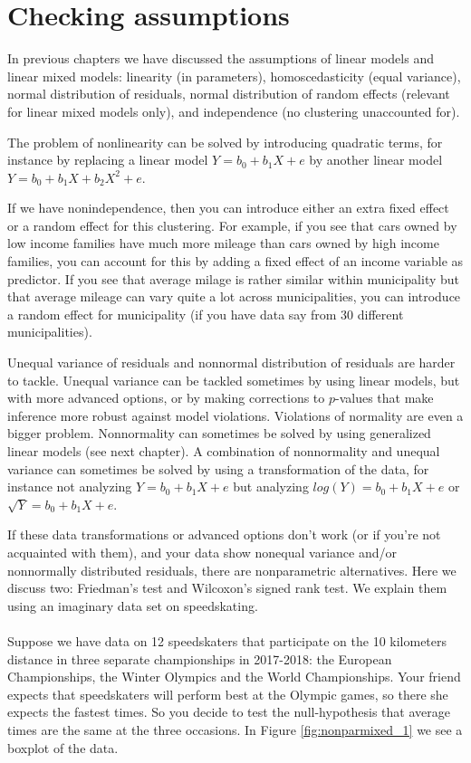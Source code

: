 \documentclass[]{book}\usepackage[]{graphicx}\usepackage[]{color}
\begin{document}
\section{Checking assumptions}

In previous chapters we have discussed the assumptions of linear models and linear mixed models: linearity (in parameters), homoscedasticity (equal variance), normal distribution of residuals, normal distribution of random effects (relevant for linear mixed models only), and independence (no clustering unaccounted for). 




The problem of nonlinearity can be solved by introducing quadratic terms, for instance by replacing a linear model $Y = b_0 + b_1 X + e$ by another linear model $Y = b_0 + b_1 X + b_2 X^2 + e$.

If we have nonindependence, then you can introduce either an extra fixed effect or a random effect for this clustering. For example, if you see that cars owned by low income families have much more mileage than cars owned by high income families, you can account for this by adding a fixed effect of an income variable as predictor. If you see that average milage is rather similar within municipality but that average mileage can vary quite a lot across municipalities, you can introduce a random effect for municipality (if you have data say from 30 different municipalities). 

Unequal variance of residuals and nonnormal distribution of residuals are harder to tackle. Unequal variance can be tackled sometimes by using linear models, but with more advanced options, or by making corrections to $p$-values that make inference more robust against model violations. Violations of normality are even a bigger problem. Nonnormality can sometimes be solved by using generalized linear models (see next chapter). A combination of nonnormality and unequal variance can sometimes be solved by using a transformation of the data, for instance not analyzing $Y = b_0 + b_1 X + e$ but analyzing $log(Y)=  b_0 + b_1 X + e$ or $\sqrt{Y}=  b_0 + b_1 X + e$.

If these data transformations or advanced options don't work (or if you're not acquainted with them), and your data show nonequal variance and/or nonnormally distributed residuals, there are nonparametric alternatives.  Here we discuss two: Friedman's test and Wilcoxon's signed rank test. We explain them using an imaginary data set on speedskating.
\\
\\
Suppose we have data on 12 speedskaters that participate on the 10 kilometers distance in three separate championships in 2017-2018: the European Championships, the Winter Olympics and the World Championships. Your friend expects that speedskaters will perform best at the Olympic games, so there she expects the fastest times. So you decide to test the null-hypothesis that average times are the same at the three occasions. In Figure \ref{fig:nonparmixed_1} we see a boxplot of the data.
\end{document}
